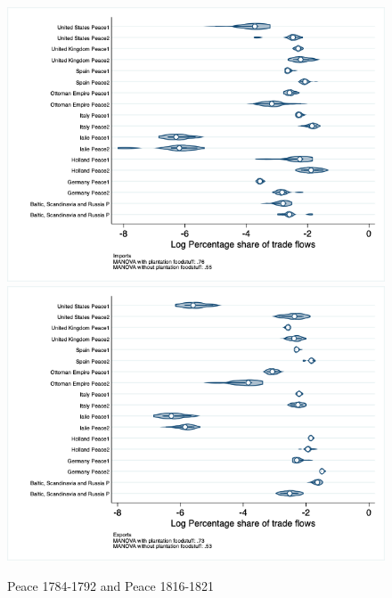\documentclass[12pt,a4paper,notitlepage,english]{article}
\begin{document}
\begin{figure}
\centering
\caption{Peace 1784-1792 and Peace 1816-1821}
\label{peace1784_1792_peace1816_1821_nat_distr_pays7}
\includegraphics[scale=.4]{peace1784_1792_peace1816_1840_nat_distr_Ipays7}
\includegraphics[scale=.4]{peace1784_1792_peace1816_1840_nat_distr_Xpays7}
\end{figure}
\end{document}

